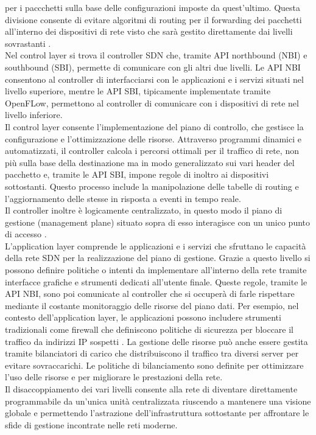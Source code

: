 per i paccchetti sulla base delle configurazioni imposte da quest'ultimo. 
Questa divisione consente di evitare algoritmi
di routing per il forwarding dei pacchetti all'interno dei dispositivi di rete visto che sarà
gestito direttamente dai livelli sovrastanti \cite{tesiSDN:2017}. 
\\Nel control layer si trova il controller SDN che, tramite API northbound (NBI) e southbound (SBI), permette di comunicare con
gli altri due livelli. Le API NBI consentono al controller di interfacciarsi con le applicazioni e i servizi situati nel livello superiore,
mentre le API SBI, tipicamente implementate tramite OpenFLow, permettono al controller di comunicare con i dispositivi di rete nel livello inferiore.
\\Il control layer consente l'implementazione del piano di controllo, che gestisce la configurazione e l'ottimizzazione delle risorse. 
Attraverso programmi dinamici e automatizzati, il controller calcola i percorsi ottimali per il traffico di rete, non più sulla base della destinazione ma in modo generalizzato sui vari header del pacchetto e, tramite le API SBI, impone regole di inoltro ai dispositivi sottostanti. 
Questo processo include la manipolazione delle tabelle di routing e l'aggiornamento delle stesse in risposta a eventi in tempo reale.
\\Il controller inoltre è logicamente centralizzato, in questo modo il piano di gestione (management plane) situato sopra di esso interagisce con un
unico punto di accesso \cite{tesiSDN:2020}.
\\L'application layer comprende le applicazioni e i servizi che sfruttano le capacità della
rete SDN per la realizzazione del piano di gestione. Grazie a questo livello si possono
definire politiche o intenti da implementare all'interno della rete tramite interfacce grafiche e strumenti dedicati all'utente finale.
Queste regole, tramite le API NBI, sono poi comunicate al
controller che si occuperà di farle rispettare mediante il costante monitoraggio delle risorse del piano dati. 
Per esempio, nel contesto dell'application layer, le applicazioni possono includere strumenti tradizionali come firewall che definiscono politiche di sicurezza per bloccare il traffico da indirizzi IP sospetti \cite{appl}. 
La gestione delle risorse può anche essere gestita tramite bilanciatori di carico che distribuiscono il traffico tra diversi server per evitare sovraccarichi.
Le politiche di bilanciamento sono definite per ottimizzare l'uso delle risorse e per migliorare le prestazioni della rete. 
\\Il disaccoppiamento dei vari livelli consente alla rete di diventare direttamente programmabile da un'unica unità
centralizzata riuscendo a mantenere una visione globale e permettendo l'astrazione dell'infrastruttura sottostante per affrontare le sfide 
di gestione incontrate nelle reti moderne.

